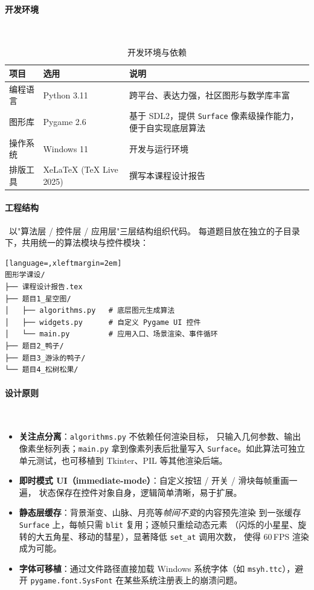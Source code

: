 \documentclass[12pt, a4paper]{article}
\begin{document}
\paragraph{开发环境}~

\begin{table}[H]
\centering
\renewcommand{\arraystretch}{1.3}
\begin{tabular}{|l|l|p{7cm}|}
\hline
\textbf{项目} & \textbf{选用} & \textbf{说明} \\
\hline
编程语言 & Python 3.11 & 跨平台、表达力强，社区图形与数学库丰富 \\
\hline
图形库 & Pygame 2.6 & 基于 SDL2，提供 \texttt{Surface} 像素级操作能力，便于自实现底层算法 \\
\hline
操作系统 & Windows 11 & 开发与运行环境 \\
\hline
排版工具 & XeLaTeX (TeX Live 2025) & 撰写本课程设计报告 \\
\hline
\end{tabular}
\caption{开发环境与依赖}
\end{table}

\paragraph{工程结构}\ 以"算法层 / 控件层 / 应用层"三层结构组织代码。
每道题目放在独立的子目录下，共用统一的算法模块与控件模块：

\begin{lstlisting}[language=,xleftmargin=2em]
图形学课设/
├── 课程设计报告.tex
├── 题目1_星空图/
│   ├── algorithms.py   # 底层图元生成算法
│   ├── widgets.py      # 自定义 Pygame UI 控件
│   └── main.py         # 应用入口、场景渲染、事件循环
├── 题目2_鸭子/        
├── 题目3_游泳的鸭子/  
└── 题目4_松树松果/  
\end{lstlisting}

\paragraph{设计原则}~

\begin{itemize}[leftmargin=*]
    \item \textbf{关注点分离}：\texttt{algorithms.py} 不依赖任何渲染目标，
    只输入几何参数、输出像素坐标列表；\texttt{main.py} 拿到像素列表后批量写入
    \texttt{Surface}。如此算法可独立单元测试，也可移植到 Tkinter、PIL 等其他渲染后端。
    \item \textbf{即时模式 UI（immediate-mode）}：自定义按钮 / 开关 / 滑块每帧重画一遍，
    状态保存在控件对象自身，逻辑简单清晰，易于扩展。
    \item \textbf{静态层缓存}：背景渐变、山脉、月亮等\textit{帧间不变}的内容预先渲染
    到一张缓存 \texttt{Surface} 上，每帧只需 \texttt{blit} 复用；逐帧只重绘动态元素
    （闪烁的小星星、旋转的大五角星、移动的彗星），显著降低 \texttt{set\_at} 调用次数，
    使得 60\,FPS 渲染成为可能。
    \item \textbf{字体可移植}：通过文件路径直接加载 Windows 系统字体（如
    \texttt{msyh.ttc}），避开 \texttt{pygame.font.SysFont} 在某些系统注册表上的崩溃问题。
\end{itemize}
\end{document}
